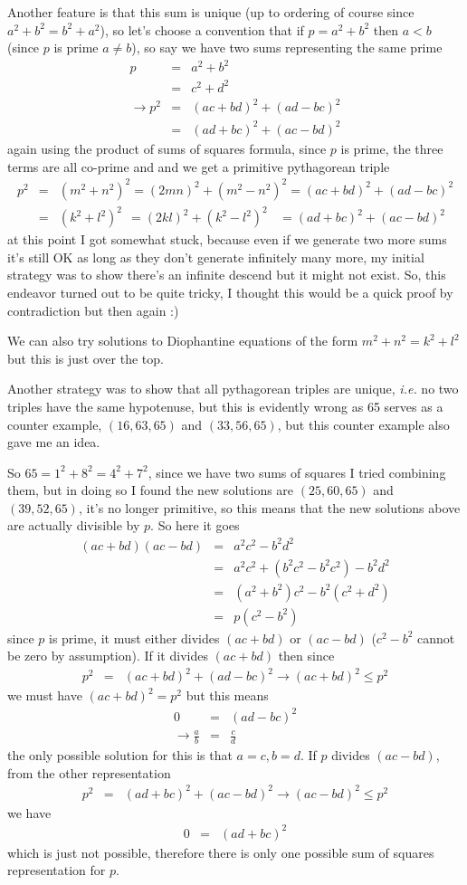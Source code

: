 \documentclass[aps,preprint,preprintnumbers,nofootinbib,showpacs,prd]{revtex4-1}
\newcommand{\ie}{{\it i.e.} }
\newcommand{\nbea}{\begin{eqnarray*}}
\newcommand{\neea}{\end{eqnarray*}}
\begin{document}
Another feature is that this sum is unique (up to ordering of course since $a^2 + b^2 = b^2 + a^2$), so let's choose a convention that if $p = a^2 + b^2$ then $a<b$ (since $p$ is prime $a \neq b$), so say we have two sums representing the same prime
%
\nbea
p & = & a^2 + b^2 \\
& = & c^2 + d^2 \\
\to p^2 & = & (ac + bd)^2 + (ad-bc)^2 \\
& = & (ad + bc)^2 + (ac-bd)^2
\neea
%
again using the product of sums of squares formula, since $p$ is prime, the three terms are all co-prime and and we get a primitive pythagorean triple
%
\nbea
p^2 & = & (m^2 + n^2)^2 = (2mn)^2  + (m^2 - n^2)^2 = (ac + bd)^2 + (ad-bc)^2 \\
& = & (k^2 + l^2)^2 ~~= (2kl)^2  + (k^2 - l^2)^2 ~~~~= (ad + bc)^2 + (ac-bd)^2 
\neea
%
at this point I got somewhat stuck, because even if we generate two more sums it's still OK as long as they don't generate infinitely many more, my initial strategy was to show there's an infinite descend but it might not exist. So, this endeavor turned out to be quite tricky, I thought this would be a quick proof by contradiction but then again :)

We can also try solutions to Diophantine equations of the form $m^2 + n^2 = k^2 + l^2$ but this is just over the top.

Another strategy was to show that all pythagorean triples are unique, \ie no two triples have the same hypotenuse, but this is evidently wrong as 65 serves as a counter example, $(16,63,65)$ and $(33,56,65)$, but this counter example also gave me an idea.

So $65 = 1^2 + 8^2 = 4^2 + 7^2$, since we have two sums of squares I tried combining them, but in doing so I found the new solutions are $(25,60,65)$ and $(39, 52, 65)$, it's no longer primitive, so this means that the new solutions above are actually divisible by $p$. So here it goes
%
\nbea
(ac + bd)(ac - bd) & = & a^2c^2 - b^2d^2 \\
& = & a^2c^2 + (b^2c^2 - b^2c^2)- b^2d^2 \\
& = & (a^2 + b^2)c^2 - b^2(c^2 + d^2) \\
& = & p(c^2 - b^2)
\neea
%
since $p$ is prime, it must either divides $(ac + bd)$ or $(ac - bd)$ ($c^2 - b^2$ cannot be zero by assumption). If it divides $(ac + bd)$ then since
%
\nbea
p^2 & = & (ac + bd)^2 + (ad-bc)^2 \longrightarrow (ac + bd)^2 \le p^2
\neea
%
we must have $(ac + bd)^2 = p^2$ but this means
%
\nbea
0 & = & (ad-bc)^2 \\
\to \frac{a}{b} & = & \frac{c}{d}
\neea
%
the only possible solution for this is that $a=c, b=d$. If $p$ divides $(ac - bd)$, from the other representation
%
\nbea
p^2 & = & (ad + bc)^2 + (ac-bd)^2 \longrightarrow (ac-bd)^2 \le p^2
\neea
%
we have 
%
\nbea
0 & = & (ad + bc)^2
\neea
%
which is just not possible, therefore there is only one possible sum of squares representation for $p$.
\end{document}
